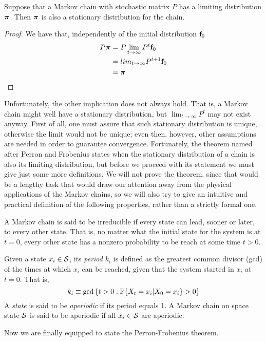 \begin{theorem}
    Suppose that a Markov chain with stochastic matrix $P$ has a limiting distribution $\boldsymbol{\pi}$. Then $\boldsymbol{\pi}$ is also a stationary distribution for the chain.
\end{theorem}
\begin{proof}
    We have that, independently of the initial distribution $\mathbf{f}_0$
    \begin{align}
        P \boldsymbol{\pi}
            & = P \lim_{t \rightarrow \infty} P^t \mathbf{f}_0 \\
            & = lim_{t \rightarrow \infty} P^{t+1} \mathbf{f}_0 \\
            & = \boldsymbol{\pi}
    \end{align}
\end{proof}
Unfortunately, the other implication does not always hold. That is, a Markov chain might well have a stationary distribution, but $\lim_{t \rightarrow \infty} P^t$ may not exist anyway. First of all, one must assure that such stationary distribution is unique, otherwise the limit would not be unique; even then, however, other assumptions are needed in order to guarantee convergence. Fortunately, the theorem named after Perron and Frobenius states when the stationary distribution of a chain is also its limiting distribution, but before we proceed with its statement we must give just some more definitions. We will not prove the theorem, since that would be a lengthy task that would draw our attention away from the physical applications of the Markov chains, so we will also try to give an intuitive and practical definition of the following properties, rather than a strictly formal one. 

\begin{ndef} 
    A Markov chain is said to be irreducible if every state can lead, sooner or later, to every other state. That is, no matter what the initial state for the system is at $t=0$, every other state has a nonzero probability to be reach at some time $t>0$.
\end{ndef}
\begin{ndef} 
    Given a state $x_i \in \mathcal{S}$, its \emph{period} $k_i$ is defined as the greatest common divisor (gcd) of the times at which $x_i$ can be reached, given that the system started in $x_i$ at $t=0$. That is,
    \begin{equation}
        k_i \equiv \text{gcd} \left\{ t>0 : \mathbb{P}\{X_t = x_i | X_0 = x_i\} > 0 \right\}
    \end{equation} 
    A \emph{state} is said to be \emph{aperiodic} if its period equals 1. A Markov chain on space state $\mathcal{S}$ is said to be aperiodic if all $x_i \in \mathcal{S}$ are aperiodic.
\end{ndef}
Now we are finally equipped to state the Perron-Frobenius theorem.

